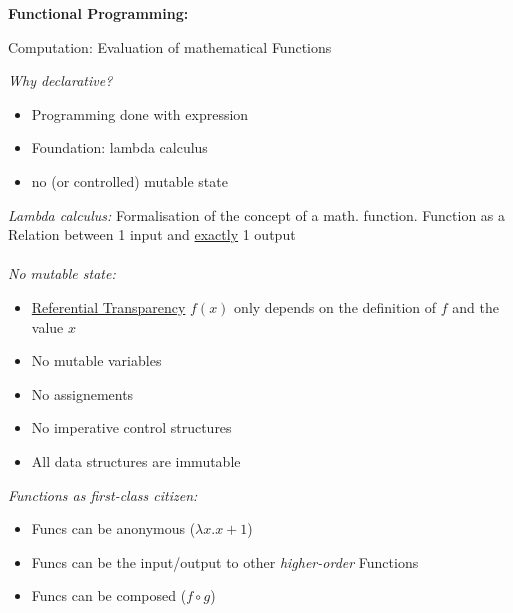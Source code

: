 \begin{breakbox}
\textbf{Functional Programming:}
\begin{center} Computation: Evaluation of mathematical Functions \end{center}
\emph{Why declarative?}
\begin{itemize}
	\setlength{\itemsep}{0pt}
    \setlength{\parskip}{0pt}
    \setlength{\parsep}{0pt}
    \setlength{\itemindent}{-0.15in}
	\item Programming done with expression
	\item Foundation: lambda calculus
	\item no (or controlled) mutable state
\end{itemize}
\emph{Lambda calculus:} Formalisation of the concept of a math. function. Function as a Relation between 1 input and \underline{exactly} 1 output \\\\
\emph{No mutable state:}
\begin{itemize}
	\setlength{\itemsep}{0pt}
    \setlength{\parskip}{0pt}
    \setlength{\parsep}{0pt}
    \setlength{\itemindent}{-0.15in}
	\item \underline{Referential Transparency} $f(x)$ only depends on the definition of $f$ and the value $x$
	\item No mutable variables
	\item No assignements
	\item No imperative control structures
	\item All data structures are immutable
\end{itemize}
\emph{Functions as first-class citizen:}
\begin{itemize}
	\setlength{\itemsep}{0pt}
    \setlength{\parskip}{0pt}
    \setlength{\parsep}{0pt}
    \setlength{\itemindent}{-0.15in}
	\item Funcs can be anonymous ($\lambda x.x+1$)
	\item Funcs can be the input/output to other \emph{higher-order} Functions
	\item Funcs can be composed ($f \circ g$)
\end{itemize}
\end{breakbox}

